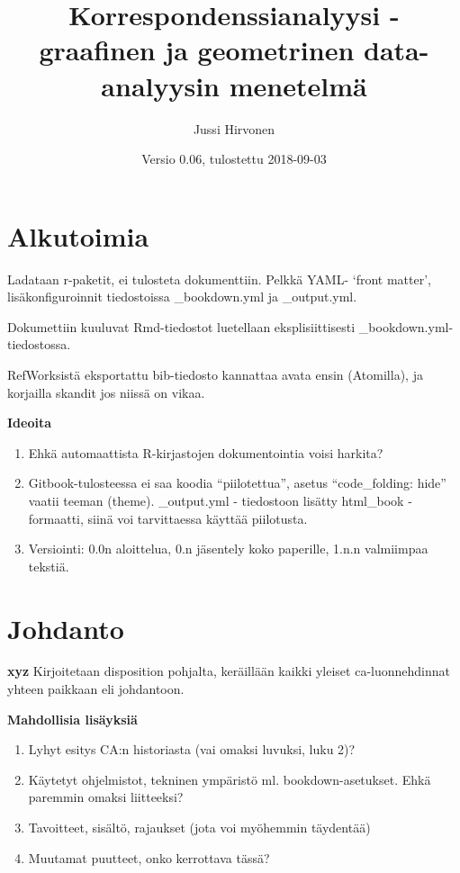 \documentclass[finnish,]{book}
\title{Korrespondenssianalyysi - graafinen ja geometrinen data-analyysin
menetelmä}
\author{Jussi Hirvonen}
\date{Versio 0.06, tulostettu 2018-09-03}
\theoremstyle{definition}
\theoremstyle{definition}
\theoremstyle{definition}
\theoremstyle{remark}
\begin{document}
\maketitle

{
\setcounter{tocdepth}{2}
\tableofcontents
}
\hypertarget{alkutoimia}{%
\chapter*{Alkutoimia}\label{alkutoimia}}

Ladataan r-paketit, ei tulosteta dokumenttiin. Pelkkä YAML- `front
matter', lisäkonfiguroinnit tiedostoissa \_bookdown.yml ja \_output.yml.

Dokumettiin kuuluvat Rmd-tiedostot luetellaan eksplisiittisesti
\_bookdown.yml-tiedostossa.

RefWorksistä eksportattu bib-tiedosto kannattaa avata ensin (Atomilla),
ja korjailla skandit jos niissä on vikaa.

\textbf{Ideoita}

\begin{enumerate}
\def\labelenumi{\arabic{enumi}.}
\item
  Ehkä automaattista R-kirjastojen dokumentointia voisi harkita?
\item
  Gitbook-tulosteessa ei saa koodia ``piilotettua'', asetus
  ``code\_folding: hide'' vaatii teeman (theme). \_output.yml -
  tiedostoon lisätty html\_book - formaatti, siinä voi tarvittaessa
  käyttää piilotusta.
\item
  Versiointi: 0.0n aloittelua, 0.n jäsentely koko paperille, 1.n.n
  valmiimpaa tekstiä.
\end{enumerate}

\hypertarget{johdanto}{%
\chapter{Johdanto}\label{johdanto}}

\textbf{xyz} Kirjoitetaan disposition pohjalta, keräillään kaikki
yleiset ca-luonnehdinnat yhteen paikkaan eli johdantoon.

\textbf{Mahdollisia lisäyksiä}

\begin{enumerate}
\def\labelenumi{\arabic{enumi}.}
\item
  Lyhyt esitys CA:n historiasta (vai omaksi luvuksi, luku 2)?
\item
  Käytetyt ohjelmistot, tekninen ympäristö ml. bookdown-asetukset. Ehkä
  paremmin omaksi liitteeksi?
\item
  Tavoitteet, sisältö, rajaukset (jota voi myöhemmin täydentää)
\item
  Muutamat puutteet, onko kerrottava tässä?
\end{enumerate}
\end{document}
